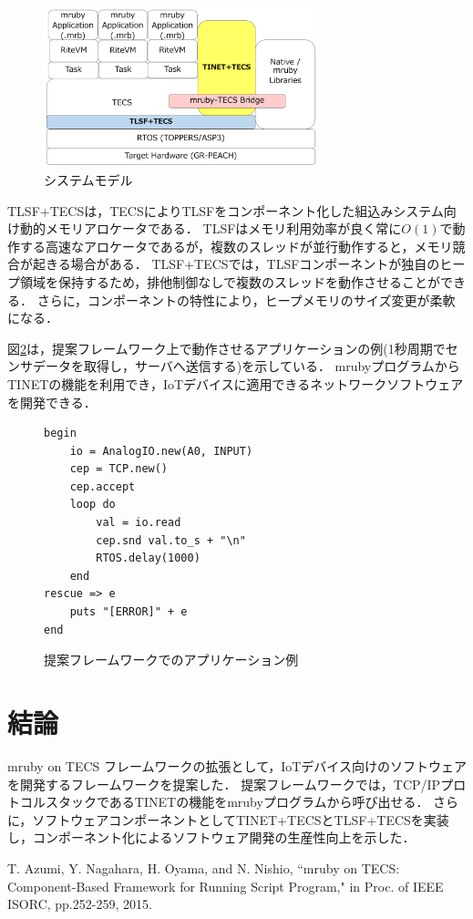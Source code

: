 \documentclass[a4j,10pt,twocolumn]{../styles/utf8/abstract}
\begin{document}
\begin{figure}[h]
    \centering
    \includegraphics[width=8cm,clip]{SystemModel.pdf}
    \vspace{-0.2cm}
    \caption{システムモデル}
    \vspace{-0.4cm}
    \label{fig:SystemModel}
\end{figure}

TLSF+TECSは，TECSによりTLSFをコンポーネント化した組込みシステム向け動的メモリアロケータである．
TLSFはメモリ利用効率が良く常に$O(1)$で動作する高速なアロケータであるが，複数のスレッドが並行動作すると，メモリ競合が起きる場合がある．
TLSF+TECSでは，TLSFコンポーネントが独自のヒープ領域を保持するため，排他制御なしで複数のスレッドを動作させることができる．
さらに，コンポーネントの特性により，ヒープメモリのサイズ変更が柔軟になる．

図\ref{src:Application}は，提案フレームワーク上で動作させるアプリケーションの例(1秒周期でセンサデータを取得し，サーバへ送信する)を示している．
mrubyプログラムからTINETの機能を利用でき，IoTデバイスに適用できるネットワークソフトウェアを開発できる．

\begin{figure}[t]
\centering
\begin{lstlisting}
begin
    io = AnalogIO.new(A0, INPUT)
    cep = TCP.new()
    cep.accept
    loop do
        val = io.read
        cep.snd val.to_s + "\n"
        RTOS.delay(1000)
    end
rescue => e
    puts "[ERROR]" + e
end
\end{lstlisting}
\vspace{-0.2cm}
\caption{提案フレームワークでのアプリケーション例}  
\vspace{-0.7cm}
\label{src:Application}
\end{figure}

\section{結論}

mruby on TECS フレームワークの拡張として，IoTデバイス向けのソフトウェアを開発するフレームワークを提案した．
提案フレームワークでは，TCP/IPプロトコルスタックであるTINETの機能をmrubyプログラムから呼び出せる．
さらに，ソフトウェアコンポーネントとしてTINET+TECSとTLSF+TECSを実装し，コンポーネント化によるソフトウェア開発の生産性向上を示した．

%
%
\begin{thebibliography}{1}
    T. Azumi, Y. Nagahara, H. Oyama, and N. Nishio, 
    ``mruby on TECS: Component-Based Framework for Running Script Program," 
    in Proc. of IEEE ISORC, 
    pp.252-259, 
    2015. 
\end{thebibliography}
\newpage
\pagebreak
\end{document}
